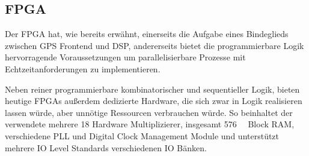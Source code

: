 
\subsection{FPGA}
Der FPGA hat, wie bereits erwähnt, einerseits die Aufgabe eines Bindeglieds zwischen GPS Frontend und DSP, andererseits bietet die programmierbare Logik hervorragende Voraussetzungen um parallelisierbare Prozesse mit Echtzeitanforderungen zu implementieren. 

Neben reiner programmierbare kombinatorischer und sequentieller Logik, bieten heutige FPGAs außerdem dedizierte Hardware, die sich zwar in Logik realisieren lassen würde, aber unnötige Ressourcen verbrauchen würde. So beinhaltet der verwendete \comfpga mehrere \SI{18}{\bit} Hardware Multiplizierer, insgesamt \SI{576}{\kilo\bit} Block RAM, verschiedene PLL und Digital Clock Management Module und unterstützt mehrere IO Level Standards verschiedenen IO Bänken.